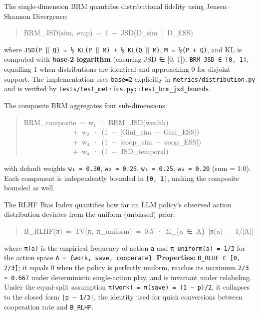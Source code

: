 

The single-dimension BRM quantifies distributional fidelity using Jensen–Shannon Divergence:

\begin{quote}\ttfamily\small\noindent
BRM\_JSD(sim,~emp)~=~1~−~JSD(D\_sim~‖~D\_ESS)
\end{quote}

where \texttt{JSD(P ‖ Q) = ½ KL(P ‖ M) + ½ KL(Q ‖ M)}, \texttt{M = ½(P + Q)}, and KL is computed with \textbf{base-2 logarithm} (ensuring JSD ∈ [0, 1]). \texttt{BRM\_JSD ∈ [0, 1]}, equalling 1 when distributions are identical and approaching 0 for disjoint support. The implementation uses \texttt{base=2} explicitly in \texttt{metrics/distribution.py} and is verified by \texttt{tests/test\_metrics.py::test\_brm\_jsd\_bounds}.

The composite BRM aggregates four sub-dimensions:

\begin{quote}\ttfamily\small\noindent
BRM\_composite~=~w₁~·~BRM\_JSD(wealth) \\~~~~~~~~~~~~~~+~w₂~·~(1~−~|Gini\_sim~−~Gini\_ESS|) \\~~~~~~~~~~~~~~+~w₃~·~(1~−~|coop\_sim~−~coop\_ESS|) \\~~~~~~~~~~~~~~+~w₄~·~(1~−~JSD\_temporal)
\end{quote}

with default weights \texttt{w₁ = 0.30}, \texttt{w₂ = 0.25}, \texttt{w₃ = 0.25}, \texttt{w₄ = 0.20} (sum = 1.0). Each component is independently bounded in \texttt{[0, 1]}, making the composite bounded as well.


The RLHF Bias Index quantifies how far an LLM policy's observed action distribution deviates from the uniform (unbiased) prior:

\begin{quote}\ttfamily\small\noindent
B\_RLHF(π)~=~TV(π,~π\_uniform)~=~0.5~·~Σ\_\{a~∈~A\}~|π(a)~−~1/|A||
\end{quote}

where \texttt{π(a)} is the empirical frequency of action \texttt{a} and \texttt{π\_uniform(a) = 1/3} for the action space \texttt{A = \{work, save, cooperate\}}. \textbf{Properties:} \texttt{B\_RLHF ∈ [0, 2/3]}; it equals 0 when the policy is perfectly uniform, reaches its maximum \texttt{2/3 ≈ 0.667} under deterministic single-action play, and is invariant under relabeling. Under the equal-split assumption \texttt{π(work) = π(save) = (1 − p)/2}, it collapses to the closed form \texttt{|p − 1/3|}, the identity used for quick conversions between cooperation rate and \texttt{B\_RLHF}.

